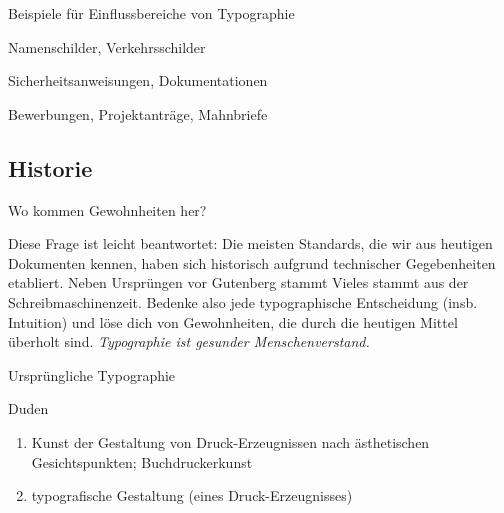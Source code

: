 \begin{frame}{Beispiele für Einflussbereiche von Typographie}
  \begin{description}[Aufmerksamkeit]
  \item[Lesbarkeit] 
    Namenschilder, 
    Verkehrsschilder
  \item[Wachsamkeit] 
    Sicherheitsanweisungen, 
    Dokumentationen
  \item[Aufmerksamkeit] 
    Bewerbungen,
    Projektanträge,
    Mahnbriefe
  \end{description}
\end{frame}


\subsection{Historie}
\begin{frame}
  \subsectionpage
  
  \centering
  Wo kommen Gewohnheiten her?
\end{frame}

Diese Frage ist leicht beantwortet: Die meisten Standards, die wir aus
heutigen Dokumenten kennen, haben sich historisch aufgrund technischer
Gegebenheiten etabliert.
Neben Ursprüngen vor Gutenberg stammt Vieles stammt aus der
Schreibmaschinenzeit.
Bedenke also jede typographische Entscheidung (insb. Intuition) und
löse dich von Gewohnheiten, die durch die heutigen Mittel überholt
sind.
\emph{Typographie ist gesunder Menschenverstand.}

\begin{frame}{Ursprüngliche Typographie}
  \begin{block}{Duden}
    \begin{enumerate}
    \item Kunst der Gestaltung von Druck-Erzeugnissen nach
      ästhetischen Gesichtspunkten; \alert{Buchdruckerkunst}
    \item typografische Gestaltung (eines Druck-Erzeugnisses)
    \end{enumerate}
  \end{block}
\end{frame}

